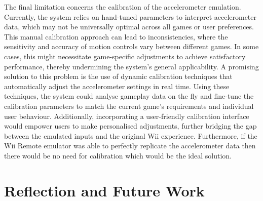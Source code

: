 The final limitation concerns the calibration of the accelerometer emulation.
Currently, the system relies on hand-tuned parameters to interpret accelerometer
data, which may not be universally optimal across all games or user preferences.
This manual calibration approach can lead to inconsistencies, where the
sensitivity and accuracy of motion controls vary between different games. In
some cases, this might necessitate game-specific adjustments to achieve
satisfactory performance, thereby undermining the system’s general
applicability. A promising solution to this problem is the use of dynamic
calibration techniques that automatically adjust the accelerometer settings in
real time. Using these techniques, the system could analyse gameplay data on the
fly and fine-tune the calibration parameters to match the current game’s
requirements and individual user behaviour. Additionally, incorporating a
user-friendly calibration interface would empower users to make personalised
adjustments, further bridging the gap between the emulated inputs and the
original Wii experience. Furthermore, if the Wii Remote emulator was able to
perfectly replicate the accelerometer data then there would be no need for
calibration which would be the ideal solution.

\section{Reflection and Future Work}



%

